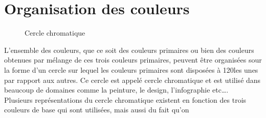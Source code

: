 \documentclass[french,a4paper]{report}
\newif\ifhighresolution
\newif\iffirstxa
\newif\iffirstxr
\begin{document}
{\section{Organisation des couleurs}
\begin{wrapfigure}{r}{9.4cm}
\centering
{}
\caption{Cercle chromatique}
\end{wrapfigure}
L'ensemble des couleurs, que ce soit des couleurs primaires ou bien des couleurs obtenues
par mélange de ces trois couleurs primaires, peuvent être organisées sour la forme d'un cercle
sur lequel les couleurs primaires sont disposées à 120\degre les unes par rapport aux autres.
Ce cercle est appelé cercle chromatique et est utilisé dans beaucoup de domaines comme la
peinture, le design, l'infographie etc\dots.\\
Plusieurs représentations du cercle chromatique existent en fonction
des trois couleurs de base qui sont utilisées, mais aussi du fait qu'on
}
\end{document}

